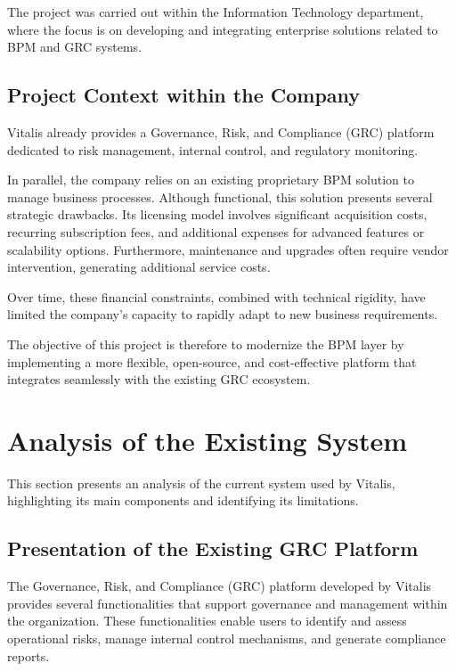 The project was carried out within the Information Technology department, where the focus is on developing and integrating enterprise solutions related to BPM and GRC systems.

\subsection{Project Context within the Company}

Vitalis already provides a Governance, Risk, and Compliance (GRC) platform dedicated to risk management, internal control, and regulatory monitoring.

In parallel, the company relies on an existing proprietary BPM solution to manage business processes. Although functional, this solution presents several strategic drawbacks. Its licensing model involves significant acquisition costs, recurring subscription fees, and additional expenses for advanced features or scalability options. Furthermore, maintenance and upgrades often require vendor intervention, generating additional service costs.

Over time, these financial constraints, combined with technical rigidity, have limited the company's capacity to rapidly adapt to new business requirements.

The objective of this project is therefore to modernize the BPM layer by implementing a more flexible, open-source, and cost-effective platform that integrates seamlessly with the existing GRC ecosystem.

\section{Analysis of the Existing System}

This section presents an analysis of the current system used by Vitalis, highlighting its main components and identifying its limitations.

\subsection{Presentation of the Existing GRC Platform}

The Governance, Risk, and Compliance (GRC) platform developed by Vitalis provides several functionalities that support governance and management within the organization. These functionalities enable users to identify and assess operational risks, manage internal control mechanisms, and generate compliance reports.


